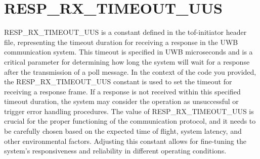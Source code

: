 \section{RESP\_RX\_TIMEOUT\_UUS}
RESP\_RX\_TIMEOUT\_UUS is a constant defined in the tof-initiator header file, representing the timeout duration for receiving a response in the UWB communication system. 
This timeout is specified in UWB microseconds and is a critical parameter for determining how long the system will wait for a response after the transmission of a poll message.
\vspace{4pt}
\newline
In the context of the code you provided, the RESP\_RX\_TIMEOUT\_UUS constant is used to set the timeout for receiving a response frame. If a response is not received within this specified timeout duration, the system may consider the operation as unsuccessful or trigger error handling procedures.
\vspace{4pt}
\newline
The value of RESP\_RX\_TIMEOUT\_UUS is crucial for the proper functioning of the communication protocol, and it needs to be carefully chosen based on the expected time of flight, system latency, and other environmental factors. Adjusting this constant allows for fine-tuning the system's responsiveness and reliability in different operating conditions.